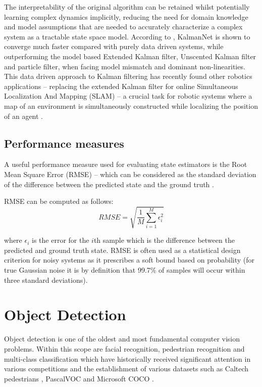 \documentclass[a4paper,twoside,12pt]{report}
\begin{document}
The interpretability of the original algorithm can be retained whilst potentially learning complex dynamics implicitly, reducing the need for domain knowledge and model assumptions that are needed to accurately characterize a complex system as a tractable state space model. According to \cite{kalmannet}, KalmanNet is shown to converge much faster compared with purely data driven systems, while outperforming the model based Extended Kalman filter, Unscented Kalman filter and particle filter, when facing model mismatch and dominant non-linearities. This data driven approach to Kalman filtering has recently found other robotics applications -- replacing the extended Kalman filter for online Simultaneous Localization And Mapping (SLAM) -- a crucial task for robotic systems where a map of an environment is simultaneously constructed while localizing the position of an agent \citep{slam}.

\subsection{Performance measures}

A useful performance measure used for evaluating state estimators is the Root Mean Square Error (RMSE) -- which can be considered as the standard deviation of the difference between the predicted state and the ground truth \citep{kalmanperform}.

RMSE can be computed as follows:
\begin{equation}
RMSE = \sqrt{\frac{1}{M}\sum^{M}_{i=1}\epsilon_{i}^{2}}
\end{equation}

where $\epsilon_{i}$ is the error for the $i$th sample which is the difference between the predicted and ground truth state. RMSE is often used as a statistical design criterion for noisy systems as it prescribes a soft bound based on probability (for true Gaussian noise it is by definition that 99.7\% of samples will occur within three standard deviations).

\newpage
\section{Object Detection}

Object detection is one of the oldest and most fundamental computer vision problems. Within this scope are facial recognition, pedestrian recognition and multi-class classification which have historically received significant attention in various competitions and the establishment of various datasets such as Caltech pedestrians \citep{peddetect}, PascalVOC \citep{vocdataset} and Microsoft COCO \citep{coco}.
\end{document}
